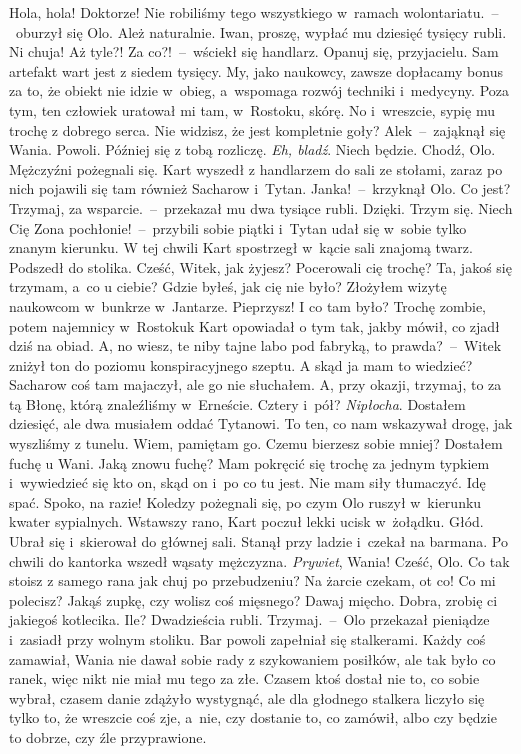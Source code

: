 \documentclass[../MAIN.tex]{subfiles}
\begin{document}
\xx Hola, hola! Doktorze! Nie robiliśmy tego wszystkiego w~ramach wolontariatu.~--~oburzył się Olo.
\xx Ależ naturalnie. Iwan, proszę, wypłać mu dziesięć tysięcy rubli.
\xx Ni chuja! Aż tyle?! Za co?!~--~wściekł się handlarz.
\xx Opanuj się, przyjacielu. Sam artefakt wart jest z siedem tysięcy. My, jako naukowcy, zawsze dopłacamy bonus za to, że obiekt nie idzie w~obieg, a~wspomaga rozwój techniki i~medycyny. Poza tym, ten człowiek uratował mi tam, w~Rostoku, skórę. No i~wreszcie, sypię mu trochę z dobrego serca. Nie widzisz, że jest kompletnie goły?
\xx Ale\3k~--~zająknął się Wania.
\xx Powoli. Później się z tobą rozliczę.
\xx \textit{Eh, bladź}. Niech będzie. Chodź, Olo.
\qm
Mężczyźni pożegnali się. Kart wyszedł z handlarzem do sali ze stołami, zaraz po nich pojawili się tam również Sacharow i~Tytan.
\sx Janka!~--~krzyknął Olo.
\xx Co jest?
\xx Trzymaj, za wsparcie.~--~przekazał mu dwa tysiące rubli.
\xx Dzięki. Trzym się. Niech Cię Zona pochłonie!~--~przybili sobie piątki i~Tytan udał się w~sobie tylko znanym kierunku.
\qm
W tej chwili Kart spostrzegł w~kącie sali znajomą twarz. Podszedł do stolika.
\sx Cześć, Witek, jak żyjesz? Pocerowali cię trochę?
\xx Ta, jakoś się trzymam, a~co u ciebie? Gdzie byłeś, jak cię nie było?
\xx Złożyłem wizytę naukowcom w~bunkrze w~Jantarze.
\xx Pieprzysz! I co tam było?
\xx Trochę zombie, potem najemnicy w~Rostoku\3k \x Kart opowiadał o tym tak, jakby mówił, co zjadł dziś na obiad.
\xx A, no wiesz, te niby tajne labo pod fabryką, to prawda?~--~Witek zniżył ton do poziomu konspiracyjnego szeptu.
\xx A skąd ja mam to wiedzieć? Sacharow coś tam majaczył, ale go nie słuchałem. A, przy okazji, trzymaj, to za tą Błonę, którą znaleźliśmy w~Erneście.
\xx Cztery i~pół? \textit{Nipłocha}.
\xx Dostałem dziesięć, ale dwa musiałem oddać Tytanowi. To ten, co nam wskazywał drogę, jak wyszliśmy z tunelu.
\xx Wiem, pamiętam go. Czemu bierzesz sobie mniej?
\xx Dostałem fuchę u Wani.
\xx Jaką znowu fuchę?
\xx Mam pokręcić się trochę za jednym typkiem i~wywiedzieć się kto on, skąd on i~po co tu jest. Nie mam siły tłumaczyć. Idę spać.
\xx Spoko, na razie!
\qm
Koledzy pożegnali się, po czym Olo ruszył w~kierunku kwater sypialnych.
Wstawszy rano, Kart poczuł lekki ucisk w~żołądku. Głód. Ubrał się i~skierował do głównej sali. Stanął przy ladzie i~czekał na barmana. Po chwili do kantorka wszedł wąsaty mężczyzna.
\sx \textit{Prywiet}, Wania!
\xx Cześć, Olo. Co tak stoisz z samego rana jak chuj po przebudzeniu?
\xx Na żarcie czekam, ot co! Co mi polecisz?
\xx Jakąś zupkę, czy wolisz coś mięsnego?
\xx Dawaj mięcho.
\xx Dobra, zrobię ci jakiegoś kotlecika.
\xx Ile?
\xx Dwadzieścia rubli.
\xx Trzymaj.~--~Olo przekazał pieniądze i~zasiadł przy wolnym stoliku.
\qm
Bar powoli zapełniał się stalkerami. Każdy coś zamawiał, Wania nie dawał sobie rady z szykowaniem posiłków, ale tak było co ranek, więc nikt nie miał mu tego za złe. Czasem ktoś dostał nie to, co sobie wybrał, czasem danie zdążyło wystygnąć, ale dla głodnego stalkera liczyło się tylko to, że wreszcie coś zje, a~nie, czy dostanie to, co zamówił, albo czy będzie to dobrze, czy źle przyprawione.
\end{document}
